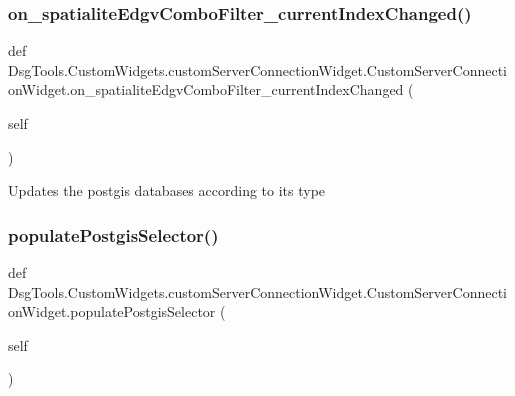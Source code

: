 \subsubsection{\texorpdfstring{on\+\_\+spatialite\+Edgv\+Combo\+Filter\+\_\+current\+Index\+Changed()}{on\_spatialiteEdgvComboFilter\_currentIndexChanged()}}
{\footnotesize\ttfamily def Dsg\+Tools.\+Custom\+Widgets.\+custom\+Server\+Connection\+Widget.\+Custom\+Server\+Connection\+Widget.\+on\+\_\+spatialite\+Edgv\+Combo\+Filter\+\_\+current\+Index\+Changed (\begin{DoxyParamCaption}\item[{}]{self }\end{DoxyParamCaption})}

\begin{DoxyVerb}Updates the postgis databases according to its type
\end{DoxyVerb}
 \mbox{\label{class_dsg_tools_1_1_custom_widgets_1_1custom_server_connection_widget_1_1_custom_server_connection_widget_a341f5f3c8f937125ec2afffa8e465f9b}} 
\subsubsection{\texorpdfstring{populate\+Postgis\+Selector()}{populatePostgisSelector()}}
{\footnotesize\ttfamily def Dsg\+Tools.\+Custom\+Widgets.\+custom\+Server\+Connection\+Widget.\+Custom\+Server\+Connection\+Widget.\+populate\+Postgis\+Selector (\begin{DoxyParamCaption}\item[{}]{self }\end{DoxyParamCaption})}

